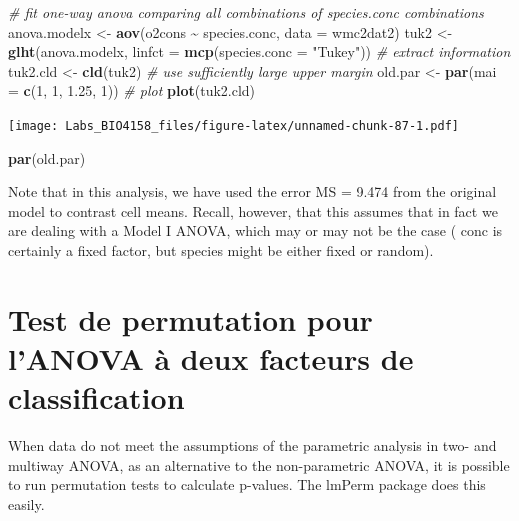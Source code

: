 \documentclass[
  12pt,
]{book}
\newenvironment{Shaded}{\begin{snugshade}}{\end{snugshade}}
\newcommand{\CommentTok}[1]{\textcolor[rgb]{0.56,0.35,0.01}{\textit{#1}}}
\newcommand{\DataTypeTok}[1]{\textcolor[rgb]{0.13,0.29,0.53}{#1}}
\newcommand{\DecValTok}[1]{\textcolor[rgb]{0.00,0.00,0.81}{#1}}
\newcommand{\FloatTok}[1]{\textcolor[rgb]{0.00,0.00,0.81}{#1}}
\newcommand{\KeywordTok}[1]{\textcolor[rgb]{0.13,0.29,0.53}{\textbf{#1}}}
\newcommand{\NormalTok}[1]{#1}
\newcommand{\OperatorTok}[1]{\textcolor[rgb]{0.81,0.36,0.00}{\textbf{#1}}}
\newcommand{\StringTok}[1]{\textcolor[rgb]{0.31,0.60,0.02}{#1}}
\begin{document}
\begin{Shaded}
\begin{Highlighting}[]
\CommentTok{\# fit one{-}way anova comparing all combinations of species.conc combinations}
\NormalTok{anova.modelx \textless{}{-}}\StringTok{ }\KeywordTok{aov}\NormalTok{(o2cons }\OperatorTok{\textasciitilde{}}\StringTok{ }\NormalTok{species.conc, }\DataTypeTok{data =}\NormalTok{ wmc2dat2)}
\NormalTok{tuk2 \textless{}{-}}\StringTok{ }\KeywordTok{glht}\NormalTok{(anova.modelx, }\DataTypeTok{linfct =} \KeywordTok{mcp}\NormalTok{(}\DataTypeTok{species.conc =} \StringTok{"Tukey"}\NormalTok{))}
\CommentTok{\# extract information}
\NormalTok{tuk2.cld \textless{}{-}}\StringTok{ }\KeywordTok{cld}\NormalTok{(tuk2)}
\CommentTok{\# use sufficiently large upper margin}
\NormalTok{old.par \textless{}{-}}\StringTok{ }\KeywordTok{par}\NormalTok{(}\DataTypeTok{mai =} \KeywordTok{c}\NormalTok{(}\DecValTok{1}\NormalTok{, }\DecValTok{1}\NormalTok{, }\FloatTok{1.25}\NormalTok{, }\DecValTok{1}\NormalTok{))}
\CommentTok{\# plot}
\KeywordTok{plot}\NormalTok{(tuk2.cld)}
\end{Highlighting}
\end{Shaded}

\texttt{[image: Labs\_BIO4158\_files/figure-latex/unnamed-chunk-87-1.pdf]}

\begin{Shaded}
\begin{Highlighting}[]
\KeywordTok{par}\NormalTok{(old.par)}
\end{Highlighting}
\end{Shaded}

Note that in this analysis, we have used the error MS = 9.474 from the original model to contrast cell means. Recall, however, that this assumes that in fact we are dealing with a Model I ANOVA, which may or may not be the case ( conc is certainly a fixed factor, but species might be either fixed or random).

\hypertarget{test-de-permutation-pour-lanova-uxe0-deux-facteurs-de-classification}{%
\section{Test de permutation pour l'ANOVA à deux facteurs de classification}\label{test-de-permutation-pour-lanova-uxe0-deux-facteurs-de-classification}}

When data do not meet the assumptions of the parametric analysis in two- and multiway ANOVA, as an alternative to the non-parametric ANOVA, it is possible to run permutation tests to calculate p-values. The lmPerm package does this easily.
\end{document}
